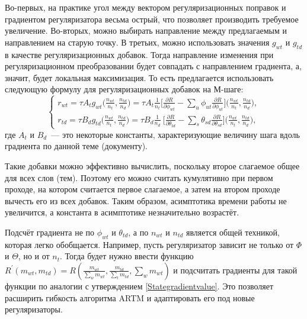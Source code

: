 \documentclass[12pt, twoside]{article}
\begin{document}
Во-первых, на практике угол между вектором регуляризационных поправок и градиентом регуляризатора весьма острый, что позволяет производить требуемое увеличение. Во-вторых, можно выбирать направление между предлагаемым  и направлением на старую точку. В третьих, можно использовать значения $g_{wt}$ и $g_{td}$ в качестве регуляризационных добавок. Тогда направление изменения при регуляризационном преобразовании будет совпадать с направлением градиента, а, значит, будет локальная максимизация. То есть предлагается использовать следующую формулу для регуляризационных добавок на М-шаге:
\begin{equation}
\label{artm_gradient}
\left\{
	\begin{aligned}
		r_{wt} = \tau A_t g_{wt}\bigg(\frac{n_{wt}}{n_t}, \frac{n_{td}}{n_d}\bigg) = \tau A_t \frac{1}{n_t} \bigg[{\frac{\partial{R}}{\partial{\phi_{wt}}} - \sum\limits_u \phi_{ut} \frac{\partial{R}}{\partial{\phi_{ut}}} }\bigg] \bigg(\frac{n_{wt}}{n_t}, \frac{n_{td}}{n_d}\bigg),\\
		r_{td} = \tau B_d g_{td} \bigg(\frac{n_{wt}}{n_t}, \frac{n_{td}}{n_d}\bigg) = \tau B_d \frac{1}{n_d} \ \bigg[ {\frac{\partial{R}}{\partial{\theta_{td}}} - \sum\limits_s \theta_{sd} \frac{\partial{R}}{\partial{\theta_{sd}}} }\bigg] \bigg(\frac{n_{wt}}{n_t}, \frac{n_{td}}{n_d}\bigg) ,
	\end{aligned}
\right.
\end{equation}
где $A_t$ и $B_d$~--- это некоторые константы, характеризующие величину шага вдоль градиента по данной теме (документу).

Такие добавки можно эффективно вычислить, поскольку второе слагаемое общее для всех слов (тем). Поэтому его можно считать кумулятивно при первом проходе, на котором считается первое слагаемое, а затем на втором проходе вычесть его из всех добавок. Таким образом, асимптотика времени работы не увеличится, а константа в асимптотике незначительно возрастёт.

Подсчёт градиента не по $\phi_{wt}$ и $\theta_{td}$, а по $n_{wt}$ и $n_{td}$ является общей техникой, которая легко обобщается. Например, пусть регуляризатор зависит не только от $\Phi$ и $\Theta$, но и от $n_t$. Тогда будет нужно ввести функцию $R^{\prime}(m_{wt}, m_{td}) = R\left( \frac{m_{wt}}{\sum\limits_w m_{wt}},  \frac{m_{td}}{\sum\limits_t m_{td}}, \sum\limits_w m_{wt}\right)$ и подсчитать градиенты для такой функции по аналогии с утверждением \ref{Stategradientvalue}. Это позволяет расширить гибкость алгоритма ARTM и адаптировать его под новые регуляризаторы.
\end{document}

